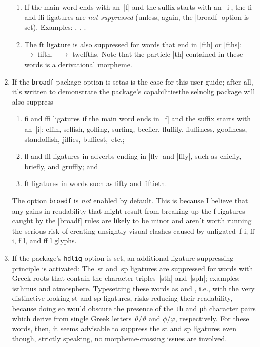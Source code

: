 \documentclass[11pt]{article}
\newcommand{\pkg}[1]{\textsf{#1}}
\newcommand{\opt}[1]{\texttt{#1}}
\begin{document}
\begin{enumerate}
\begin{enumerate}
\item If the main word ends with an~|f| and the suffix starts with an~|i|, the fi and ffi ligatures are \emph{not suppressed} (unless, again, the |broadf| option is set). Examples: 
, 
, 
.

\item The ft ligature is also suppressed for words that end in |fth| or |fths|: ~$\to$ fifth, ~$\to$ twelfths. Note that the particle |th| contained in these words is a derivational morpheme.

\end{enumerate}


\item 
If the \opt{broadf} package option is set\textemdash as is the case for this user guide; after all, it's written to demonstrate the package's capabilities\textemdash the \pkg{selnolig} package will also suppress
\begin{enumerate}
\item fi and ffi ligatures if the main word ends in~|f| and the suffix starts with an~|i|: elfin, selfish, golfing, surfing, beefier, fluffily, fluffiness, goofiness, standoffish, jiffies, buffiest,~etc.;
\item fl and ffl ligatures in adverbs ending in |fly| and |ffly|, such as chiefly, briefly, and gruffly; and
\item ft ligatures in words such as fifty and fiftieth.
\end{enumerate}


The option \opt{broadf} is \emph{not} enabled by default. This is because I believe that any gains in readability that might result from breaking up the f-ligatures caught by the |broadf| rules are likely to be minor and aren't worth running the serious risk of creating unsightly visual clashes caused by unligated~f\kern0pt i, ff\kern0pt i, f\kern0pt l, and ff\kern0pt l glyphs.

\item 
If the package's \opt{hdlig} option is set, an additional ligature-suppressing principle is activated:
The~st and~sp ligatures are suppressed for words with Greek roots that contain the character triples~|sth| and~|sph|; examples: isthmus and atmosphere. Typesetting these words as  and , i.e., with the very distinctive looking st and sp ligatures, risks reducing their readability, because doing so would obscure the presence of the \opt{th} and \opt{ph} character pairs which derive from single Greek letters~$\theta$/$\vartheta$ and $\phi$/$\varphi$, respectively. For these words, then, it seems advisable to suppress the st and sp ligatures even though, strictly speaking, no morpheme-crossing issues are involved. 


\end{enumerate}
\end{document}
